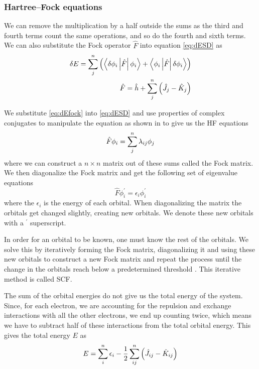 \documentclass[../master_thesis.tex]{subfiles}
\begin{document}
\subsubsection{Hartree--Fock equations}
We can remove the multiplication by a half outside the sums as the third and fourth
terms count the same operations, and so do the fourth and sixth terms. We can also
substitute the Fock operator $\hat{F}$ into equation \ref{eq:dESD} as \cite{Jensen:2017}
\begin{align}\label{eq:dEfock}
  \delta E = \sumdef[n]{j}\left(\left\langle\delta\phi_i \left| \hat{F} \right| \phi_i \right\rangle + \left\langle\phi_i \left| \hat{F} \right| \delta\phi_i \right\rangle\right)\\\label{}
    \hat{F} = \hat{h} + \sumdef[n]{j}\left(\hat{J}_j - \hat{K}_j\right)
\end{align}

We substitute \ref{eq:dEfock} into \ref{eq:dESD} and use properties of complex conjugates
to manipulate the equation as shown in \cite{Jensen:2017} to give us the \ac{HF}
equations
\begin{equation}\label{eq:Fockequations}
\hat{F}\phi_i = \sumdef[n]{j}\lambda_{ij}\phi_j
\end{equation}
where we can construct a $n\times n$ matrix out of these sums called the Fock matrix.
We then diagonalize the Fock matrix and get the following set of eigenvalue equations
\begin{equation}\label{eq:diagFockequations}
\hat{F}\phi_i^{\prime} = \epsilon_i\phi_i^{\prime}
\end{equation}
where the $\epsilon_i$ is the energy of each orbital. When diagonalizing the matrix the
orbitals get changed slightly, creating new orbitals. We denote these new orbitals with a $^\prime$
superscript.

In order for an orbital to be known, one must know the rest of the
orbitals. We solve this by iteratively forming the Fock matrix, diagonalizing it
and using these new orbitals to construct a new Fock matrix and repeat the
process until the change in the orbitals reach below a predetermined threshold
\cite{Helgaker:2012, Cramer:2004}. This iterative method is called \ac{SCF}.

The sum of the orbital energies do not give us the total energy of the system.
Since, for each electron,  we are accounting for the repulsion and exchange interactions with all the
other electrons, we end up counting twice, which means we have to subtract half of
these interactions from the total orbital energy. This gives the total energy $E$ as
\cite{Jensen:2017}
\begin{equation}
  E = \sumdef[n]{i}\epsilon_i - \frac{1}{2}\sumdef[n]{ij}\left(\hat{J}_{ij} - \hat{K}_{ij}\right)
\end{equation}
\end{document}
